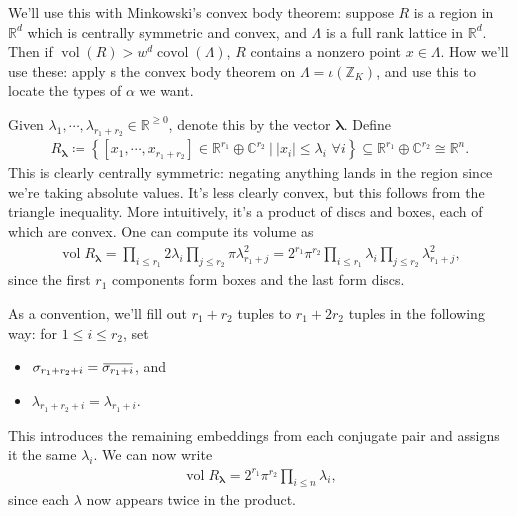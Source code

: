 \begin{remark}
We'll use this with Minkowski's convex body theorem: suppose \(R\) is a
region in \({\mathbb{R}}^d\) which is centrally symmetric and convex,
and \(\Lambda\) is a full rank lattice in \({\mathbb{R}}^d\). Then if
\(\operatorname{vol}(R)> w^d \operatorname{covol}(\Lambda)\), \(R\)
contains a nonzero point \(x\in \Lambda\). How we'll use these: apply s
the convex body theorem on \(\Lambda = \iota({\mathbb{Z}}_K)\), and use
this to locate the types of \(\alpha\) we want.

\end{remark}

\begin{remark}

Given
\(\lambda_1, \cdots, \lambda_{r_1 + r_2} \in {\mathbb{R}}^{\geq 0}\),
denote this by the vector \(\mathbf{\lambda}\). Define
\begin{align*}
R_{\mathbf{\lambda}}\coloneqq\left\{{ {\left[ {x_1, \cdots, x_{r_1 + r_2}} \right]} \in {\mathbb{R}}^{r_1} \oplus {\mathbb{C}}^{r_2} {~\mathrel{\Big|}~}{\left\lvert {x_i} \right\rvert} \leq \lambda_i\,\,\forall i  }\right\} \subseteq {\mathbb{R}}^{r_1} \oplus {\mathbb{C}}^{r_2} \cong {\mathbb{R}}^{n}
.\end{align*}
This is clearly centrally symmetric: negating anything lands in the
region since we're taking absolute values. It's less clearly convex, but
this follows from the triangle inequality. More intuitively, it's a
product of discs and boxes, each of which are convex. One can compute
its volume as
\begin{align*}
\operatorname{vol}R_{\mathbf{\lambda}} = \prod_{i\leq r_1} 2\lambda_i \prod_{j\leq r_2} \pi \lambda_{r_1 + j}^2
= 2^{r_1} \pi^{r_2} \prod_{i\leq r_1} \lambda_i \prod_{j\leq r_2} \lambda_{r_1 + j}^2
,\end{align*}
since the first \(r_1\) components form boxes and the last form discs.

As a convention, we'll fill out \(r_1+r_2\) tuples to \(r_1 + 2r_2\)
tuples in the following way: for \(1 \leq i\leq r_2\), set

\begin{itemize}
\tightlist
\item
  \(\sigma_{r_1 + r_2 + i} = \mkern 1.5mu\overline{\mkern-1.5mu\sigma_{r_1 + i}\mkern-1.5mu}\mkern 1.5mu\),
  and
\item
  \(\lambda_{r_1 + r_2 + i} = \lambda_{r_1 + i}\).
\end{itemize}

This introduces the remaining embeddings from each conjugate pair and
assigns it the same \(\lambda_i\). We can now write
\begin{align*}
\operatorname{vol}R_{\mathbf{\lambda}} = 2^{r_1}\pi^{r_2} \prod_{i\leq n} \lambda_i
,\end{align*}
since each \(\lambda\) now appears twice in the product.

\end{remark}

